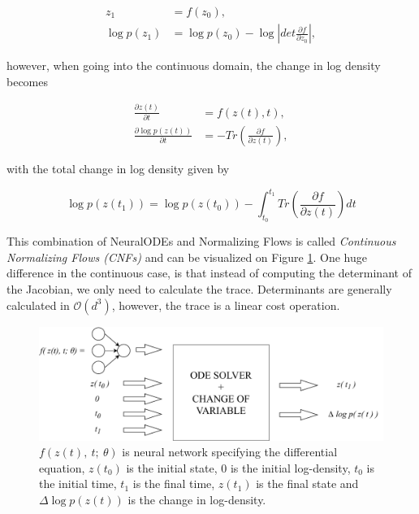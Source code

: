\begin{align}
    z_{1} &= f(z_{0}), \\
    \log p(z_{1}) &= \log p(z_{0}) - \log \left \lvert det \frac{\partial f}{\partial z_{0}} \right \rvert,
\end{align}

however, when going into the continuous domain, the change in log density becomes

\begin{align}
    \frac{\partial z(t)}{\partial t} &= f(z(t), t), \\
    \frac {\partial \log p(z(t))} {\partial t} &= -Tr \left( \frac{\partial f}{\partial z(t)} \right),
\end{align}

with the total change in log density given by

\begin{displaymath}
    \log p(z(t_1)) = \log p(z(t_0)) - \int_{t_0}^{t_1} Tr \left( \frac{\partial f}{\partial z(t)} \right) dt    
\end{displaymath}

This combination of NeuralODEs and Normalizing Flows is called \emph{Continuous Normalizing Flows (CNFs)} and can be visualized on Figure \ref{figure:cnf:cnfs_visualization}. One huge difference in the continuous case, is that instead of computing the determinant of the Jacobian, we only need to calculate the trace. Determinants are generally calculated in $ \mathcal{O}(d^3) $, however, the trace is a linear cost operation.

\begin{figure}[ht]
      \centering
      \includegraphics[width=\columnwidth]{figures/cnfs_visualization.pdf}
      \caption{$f(z(t), \ t; \ \theta) $ is neural network specifying the differential equation, $ z(t_0) $ is the initial state, $ 0 $ is the initial log-density, $ t_0 $ is the initial time, $ t_1 $ is the final time, $ z(t_1) $ is the final state and $ \Delta \log p(z(t)) $ is the change in log-density.}
      \label{figure:cnf:cnfs_visualization}
\end{figure}

